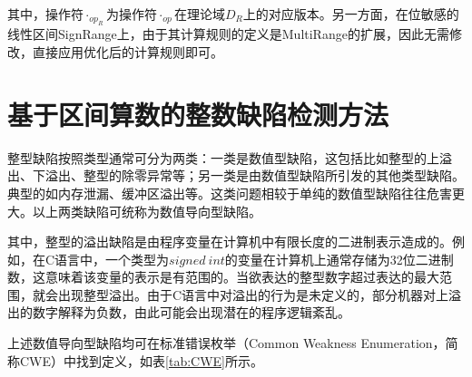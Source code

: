 其中，操作符$ \cdot_{op_R} $为操作符$ \cdot_{op} $在理论域$ D_R $上的对应版本。另一方面，在位敏感的线性区间SignRange上，由于其计算规则的定义是MultiRange的扩展，因此无需修改，直接应用优化后的计算规则即可。


\section{基于区间算数的整数缺陷检测方法}
\label{sec:区间算数缺陷检测方法}

整型缺陷按照类型通常可分为两类：一类是数值型缺陷，这包括比如整型的上溢出、下溢出、整型的除零异常等；另一类是由数值型缺陷所引发的其他类型缺陷。典型的如内存泄漏、缓冲区溢出等。这类问题相较于单纯的数值型缺陷往往危害更大。以上两类缺陷可统称为数值导向型缺陷。

其中，整型的溢出缺陷是由程序变量在计算机中有限长度的二进制表示造成的。例如，在C语言中，一个类型为$ signed ~int $的变量在计算机上通常存储为32位二进制数，这意味着该变量的表示是有范围的。当欲表达的整型数字超过表达的最大范围，就会出现整型溢出。由于C语言中对溢出的行为是未定义的，部分机器对上溢出的数字解释为负数，由此可能会出现潜在的程序逻辑紊乱。

上述数值导向型缺陷均可在标准错误枚举（Common Weakness Enumeration，简称CWE）中找到定义，如表\ref{tab:CWE}所示。


